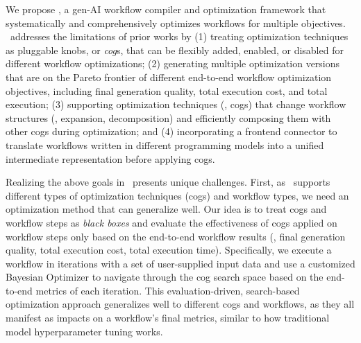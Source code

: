 We propose \textbf{\textit{\sysname}}, a gen-AI workflow compiler and optimization framework that systematically and comprehensively optimizes workflows for multiple objectives. \sysname\ addresses the limitations of prior works by 
(1) treating optimization techniques as pluggable knobs, or {\textit{cog}s}, that can be flexibly added, enabled, or disabled for different workflow optimizations; 
(2) generating multiple optimization versions that are on the Pareto frontier of different end-to-end workflow optimization objectives, including final generation quality, total execution cost, and total execution; 
(3) supporting optimization techniques (\ie, cogs) that change workflow structures (\eg, expansion, decomposition) and efficiently composing them with other cogs during optimization; 
and (4) incorporating a frontend connector to translate workflows written in different programming models into a unified intermediate representation before applying cogs. 


Realizing the above goals in \sysname\ presents unique challenges.
First, as \sysname\ supports different types of optimization techniques (cogs) and workflow types, we need an optimization method that can generalize well.
Our idea is to treat cogs and workflow steps as {\em black boxes} and evaluate the effectiveness of cogs applied on workflow steps only based on the end-to-end workflow results (\ie, final generation quality, total execution cost, total execution time).
Specifically, we execute a workflow in iterations with a set of user-supplied input data and use a customized Bayesian Optimizer to navigate through the cog search space based on the end-to-end metrics of each iteration.
This evaluation-driven, search-based optimization approach generalizes well to different cogs and workflows, as they all manifest as impacts on a workflow's final metrics, similar to how traditional model hyperparameter tuning works.

